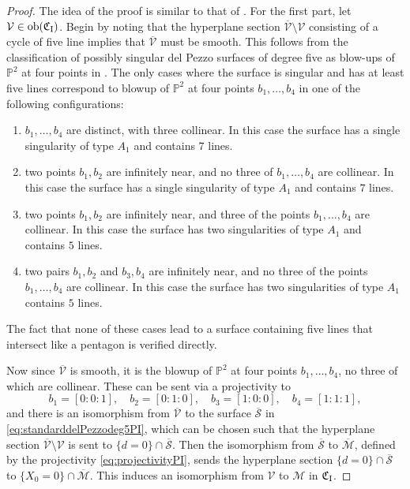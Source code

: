 \documentclass[a4paper,reqno]{amsart}
\numberwithin{equation}{section}
\newcommand{\p}{\mathbb{P}}
\numberwithin{equation}{section}
\begin{document}
\begin{proof}
The idea of the proof is similar to that of .
For the first part, let $\mathcal{V}\in \operatorname{ob}(\mathfrak{C}_{\rm{I}})$. 
Begin by noting that the hyperplane section $\overline{\mathcal{V}}\setminus \mathcal{V}$ consisting of a cycle of five line implies that $\overline{\mathcal{V}}$ must be smooth. 
This follows from the classification of possibly singular del Pezzo surfaces of degree five as blow-ups of $\p^2$ at four points in \cite[Sec. 8.5]{dolgachevclassicalAG}.
The only cases where the surface is singular and has at least five lines correspond to blowup of $\p^2$ at four points $b_1,\dots,b_4$ in one of the following configurations:
\begin{enumerate}
    \item $b_1,\dots,b_4$ are distinct, with three collinear. In this case the surface has a single singularity of type $A_1$ and contains $7$ lines.
    \item two points $b_1,b_2$ are infinitely near, and no three of $b_1,\dots,b_4$ are collinear. In this case the surface has a single singularity of type $A_1$ and contains $7$ lines.
    \item two points $b_1,b_2$ are infinitely near, and three of the points $b_1,\dots,b_4$ are collinear. In this case the surface has two singularities of type $A_1$ and contains $5$ lines.
    \item two pairs $b_1,b_2$ and $b_3,b_4$ are infinitely near, and no three of the points $b_1,\dots,b_4$ are collinear. In this case the surface has two singularities of type $A_1$ contains $5$ lines.
\end{enumerate}
The fact that none of these cases lead to a surface containing five lines that intersect like a pentagon is verified directly.

Now since $\overline{\mathcal{V}}$ is smooth, it is the blowup of $\p^2$ at four points $b_1,\dots,b_4$, no three of which are collinear.
These can be sent via a projectivity to 
$$b_1 = [0:0:1], \quad b_2 = [0:1:0], \quad b_3=[1:0:0], \quad b_4 = [1:1:1],$$ and there is an isomorphism from $\overline{\mathcal{V}}$ to the surface $\overline{\mathcal{S}}$ in \cref{eq:standarddelPezzodeg5PI}, which can be chosen such that the hyperplane section $\overline{\mathcal{V}}\setminus \mathcal{V}$ is sent to $\{d=0\}\cap\overline{\mathcal{S}}$.
Then the isomorphism from $\overline{\mathcal{S}}$ to $\overline{\mathcal{M}}$, defined by the projectivity \eqref{eq:projectivityPI},  sends the hyperplane section $\{d=0\}\cap \overline{\mathcal{S}}$ to $\{X_0=0\}\cap \overline{\mathcal{M}}$. 
This induces an isomorphism from  $\mathcal{V}$ to $\mathcal{M}$ in $\mathfrak{C}_{\rm{I}}$.


\end{proof}
\end{document}
